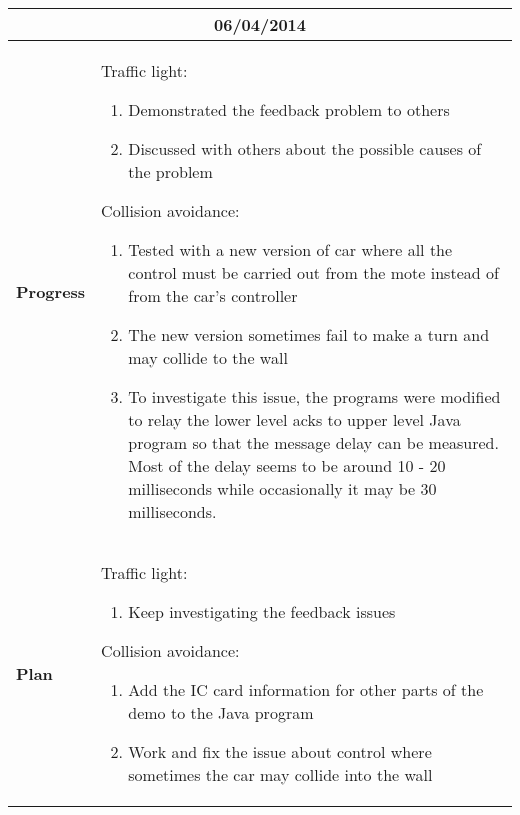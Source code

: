 \begin{center}
\begin{longtable}{ | p{2cm} | p{10cm} | }
                \multicolumn{2}{|c|}{\textbf{06/04/2014}} \\ \hline
                \textbf{Progress} & Traffic light:
                \begin{enumerate}
                  \item Demonstrated the feedback problem to others
                  \item Discussed with others about the possible causes of the problem
                \end{enumerate}
                Collision avoidance:
                \begin{enumerate}
                  \item Tested with a new version of car where all the control must be carried out from the mote instead of from the car's controller
                  \item The new version sometimes fail to make a turn and may collide to the wall
                  \item To investigate this issue, the programs were modified to relay the lower level acks to upper level Java program so that the message delay can be measured. Most of the delay seems to be around 10 - 20 milliseconds while occasionally it may be 30 milliseconds.
                \end{enumerate} \\ \hline
                \textbf{Plan} & Traffic light:
                \begin{enumerate}
                  \item Keep investigating the feedback issues
                \end{enumerate}
                Collision avoidance:
                \begin{enumerate}
                \item Add the IC card information for other parts of the demo to the Java program
                \item Work and fix the issue about control where sometimes the car may collide into the wall
                \end{enumerate} \\ \hline


\end{longtable}
\end{center}
